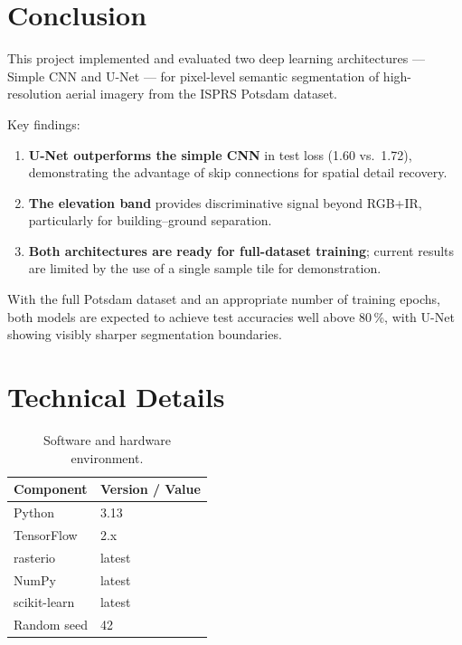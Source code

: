 \documentclass[12pt,a4paper]{article}
\begin{document}
\section{Conclusion}

This project implemented and evaluated two deep learning architectures ---
Simple CNN and U-Net --- for pixel-level semantic segmentation of high-resolution
aerial imagery from the ISPRS Potsdam dataset.

Key findings:
\begin{enumerate}[itemsep=3pt]
  \item \textbf{U-Net outperforms the simple CNN} in test loss (1.60 vs.\ 1.72),
        demonstrating the advantage of skip connections for spatial detail recovery.
  \item \textbf{The elevation band} provides discriminative signal beyond RGB+IR,
        particularly for building--ground separation.
  \item \textbf{Both architectures are ready for full-dataset training}; current
        results are limited by the use of a single sample tile for demonstration.
\end{enumerate}

With the full Potsdam dataset and an appropriate number of training epochs,
both models are expected to achieve test accuracies well above 80\,\%, with
U-Net showing visibly sharper segmentation boundaries.

\section*{Technical Details}

\begin{table}[h!]
  \centering
  \caption{Software and hardware environment.}
  \begin{tabular}{ll}
    \toprule
    \textbf{Component} & \textbf{Version / Value} \\
    \midrule
    Python      & 3.13 \\
    TensorFlow  & 2.x \\
    rasterio    & latest \\
    NumPy       & latest \\
    scikit-learn & latest \\
    Random seed & 42 \\
    \bottomrule
  \end{tabular}
\end{table}
\end{document}

